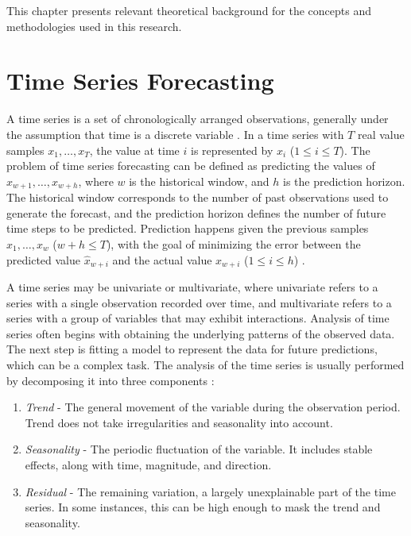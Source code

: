 This chapter presents relevant theoretical background for the concepts and methodologies used in this research.

\section{Time Series Forecasting}
A time series is a set of chronologically arranged observations, generally under the assumption that time is a discrete variable \cite{kirchgassner_introduction_2012}. In a time series with $T$ real value samples $x_1, \dots, x_T$, the value at time $i$ is represented by $x_i$ ($1 \leq i \leq T$). The problem of time series forecasting can be defined as predicting the values of $x_{w+1}, \dots, x_{w+h}$, where $w$ is the historical window, and $h$ is the prediction horizon. The historical window corresponds to the number of past observations used to generate the forecast, and the prediction horizon defines the number of future time steps to be predicted. Prediction happens given the previous samples $x_1, \dots, x_w$ ($w+h \leq T$), with the goal of minimizing the error between the predicted value $\hat{x}_{w+i}$ and the actual value $x_{w+i}$ ($1 \leq i \leq h$) \cite{divina_stacking_2018}.

A time series may be univariate or multivariate, where univariate refers to a series with a single observation recorded over time, and multivariate refers to a series with a group of variables that may exhibit interactions.
Analysis of time series often begins with obtaining the underlying patterns of the observed data. The next step is fitting a model to represent the data for future predictions, which can be a complex task. The analysis of the time series is usually performed by decomposing it into three components \cite{deb_review_2017,brockwell_introduction_2002}:
\begin{enumerate}
    \item \emph{Trend} \hyp{} The general movement of the variable during the observation period. Trend does not take irregularities and seasonality into account.
    \item \emph{Seasonality} \hyp{} The periodic fluctuation of the variable. It includes stable effects, along with time, magnitude, and direction.
    \item \emph{Residual} \hyp{} The remaining variation, a largely unexplainable part of the time series. In some instances, this can be high enough to mask the trend and seasonality.
\end{enumerate}

